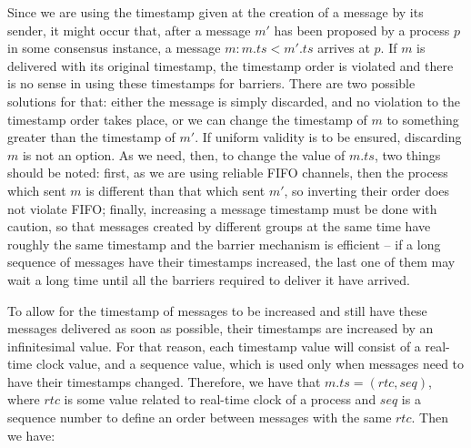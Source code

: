 \documentclass[times, 10pt]{article}
\begin{document}
Since we are using the timestamp given at the creation of a message by its sender, it might occur that, after a message $m'$ has been proposed by a process $p$ in some consensus instance, a message $m : m.ts < m'.ts$ arrives at $p$. If $m$ is delivered with its original timestamp, the timestamp order is violated and there is no sense in using these timestamps for barriers. There are two possible solutions for that: either the message is simply discarded, and no violation to the timestamp order takes place, or we can change the timestamp of $m$ to something greater than the timestamp of $m'$. If uniform validity is to be ensured, discarding $m$ is not an option. As we need, then, to change the value of $m.ts$, two things should be noted: first, as we are using reliable FIFO channels, then the process which sent $m$ is different than that which sent $m'$, so inverting their order does not violate FIFO; finally, increasing a message timestamp must be done with caution, so that messages created by different groups at the same time have roughly the same timestamp and the barrier mechanism is efficient -- if a long sequence of messages have their timestamps increased, the last one of them may wait a long time until all the barriers required to deliver it have arrived.


To allow for the timestamp of messages to be increased and still have these messages delivered as soon as possible, their timestamps are increased by an infinitesimal value. For that reason, each timestamp value will consist of a real-time clock value, and a sequence value, which is used only when messages need to have their timestamps changed. Therefore, we have that $m.ts = (rtc, seq)$, where $rtc$ is some value related to real-time clock of a process and $seq$ is a sequence number to define an order between messages with the same $rtc$. Then we have:
\end{document}
